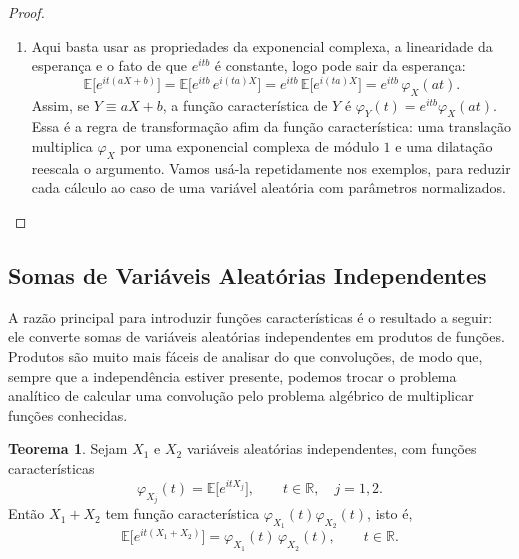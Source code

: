 \documentclass[12pt,portuguese]{article}
\theoremstyle{definition}
\newtheorem{theorem}{Teorema}
\theoremstyle{plainexercise}
\theoremstyle{starredexercise}
\theoremstyle{definition}
\begin{document}
\begin{proof}
\begin{enumerate}[label=(\alph*)]
\item Aqui basta usar as propriedades da exponencial complexa, a linearidade da
esperança e o fato de que $e^{itb}$ é constante, logo pode sair da esperança:
\[
\mathbb{E}\bigl[e^{it(aX+b)}\bigr]
=\mathbb{E}\bigl[e^{itb}\,e^{i(ta)X}\bigr]
=e^{itb}\,\mathbb{E}\bigl[e^{i(ta)X}\bigr]
=e^{itb}\,\varphi_X(at).
\]
Assim, se $Y\equiv aX+b$, a função característica de $Y$ é
$\varphi_Y(t)=e^{itb}\varphi_X(at)$. Essa é a regra de transformação afim da
função característica: uma translação multiplica $\varphi_X$ por uma exponencial
complexa de módulo $1$ e uma dilatação reescala o argumento. Vamos usá-la
repetidamente nos exemplos, para reduzir cada cálculo ao caso de uma variável
aleatória com parâmetros normalizados.
\end{enumerate}
\end{proof}

\subsection{Somas de Variáveis Aleatórias Independentes}\label{subsec:fc-soma}

A razão principal para introduzir funções características é o resultado a seguir:
ele converte somas de variáveis aleatórias independentes em produtos de funções.
Produtos são muito mais fáceis de analisar do que convoluções, de modo que,
sempre que a independência estiver presente, podemos trocar o problema analítico
de calcular uma convolução pelo problema algébrico de multiplicar funções
conhecidas.

\begin{theorem}\label{thm:fc-soma-independentes}
Sejam $X_1$ e $X_2$ variáveis aleatórias independentes, com funções
características
\[
\varphi_{X_j}(t) = \mathbb{E}\big[e^{itX_j}\big], \qquad t \in \mathbb{R}, \quad j = 1,2.
\]
Então $X_1 + X_2$ tem função característica $\varphi_{X_1}(t)\varphi_{X_2}(t)$, isto é,
\[
\mathbb{E}\big[e^{it(X_1+X_2)}\big] = \varphi_{X_1}(t)\,\varphi_{X_2}(t),
\qquad t \in \mathbb{R}.
\]
\end{theorem}
\end{document}
